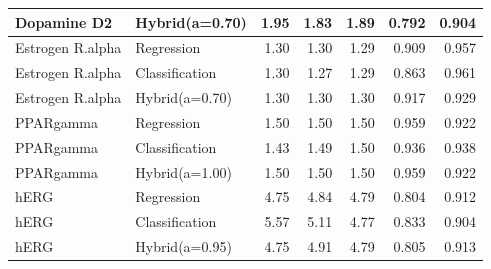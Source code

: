 \begin{table}[ht]
\begin{tabular}{llrrrrr}
Dopamine D2 & Hybrid(a=0.70) & 1.95 & 1.83 & 1.89 & 0.792 & 0.904 \\
\midrule
Estrogen R.alpha & Regression & 1.30 & 1.30 & 1.29 & 0.909 & 0.957 \\
Estrogen R.alpha & Classification & 1.30 & 1.27 & 1.29 & 0.863 & 0.961 \\
Estrogen R.alpha & Hybrid(a=0.70) & 1.30 & 1.30 & 1.30 & 0.917 & 0.929 \\
\midrule
PPARgamma & Regression & 1.50 & 1.50 & 1.50 & 0.959 & 0.922 \\
PPARgamma & Classification & 1.43 & 1.49 & 1.50 & 0.936 & 0.938 \\
PPARgamma & Hybrid(a=1.00) & 1.50 & 1.50 & 1.50 & 0.959 & 0.922 \\
\midrule
hERG & Regression & 4.75 & 4.84 & 4.79 & 0.804 & 0.912 \\
hERG & Classification & 5.57 & 5.11 & 4.77 & 0.833 & 0.904 \\
hERG & Hybrid(a=0.95) & 4.75 & 4.91 & 4.79 & 0.805 & 0.913 \\
\bottomrule
\end{tabular}
\end{table}
